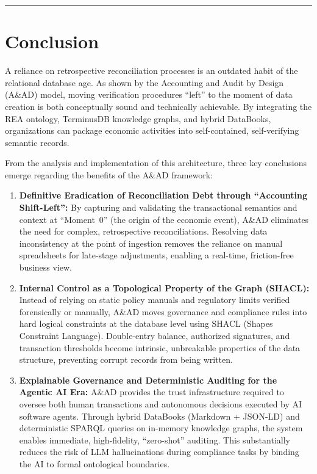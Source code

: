 \documentclass[12pt, a4paper]{article}
\begin{document}
\hrule
\vspace{1em}
\clearpage

\section{Conclusion}

A reliance on retrospective reconciliation processes is an outdated habit of the relational database age. As shown by the Accounting and Audit by Design (A\&AD) model, moving verification procedures ``left'' to the moment of data creation is both conceptually sound and technically achievable. By integrating the REA ontology, TerminusDB knowledge graphs, and hybrid DataBooks, organizations can package economic activities into self-contained, self-verifying semantic records.

From the analysis and implementation of this architecture, three key conclusions emerge regarding the benefits of the A\&AD framework:

\begin{enumerate}
\item \textbf{Definitive Eradication of Reconciliation Debt through ``Accounting Shift-Left'':} By capturing and validating the transactional semantics and context at ``Moment~0'' (the origin of the economic event), A\&AD eliminates the need for complex, retrospective reconciliations. Resolving data inconsistency at the point of ingestion removes the reliance on manual spreadsheets for late-stage adjustments, enabling a real-time, friction-free business view.

\item \textbf{Internal Control as a Topological Property of the Graph (SHACL):} Instead of relying on static policy manuals and regulatory limits verified forensically or manually, A\&AD moves governance and compliance rules into hard logical constraints at the database level using SHACL (Shapes Constraint Language). Double-entry balance, authorized signatures, and transaction thresholds become intrinsic, unbreakable properties of the data structure, preventing corrupt records from being written.

\item \textbf{Explainable Governance and Deterministic Auditing for the Agentic AI Era:} A\&AD provides the trust infrastructure required to oversee both human transactions and autonomous decisions executed by AI software agents. Through hybrid DataBooks (Markdown + JSON-LD) and deterministic SPARQL queries on in-memory knowledge graphs, the system enables immediate, high-fidelity, ``zero-shot'' auditing. This substantially reduces the risk of LLM hallucinations during compliance tasks by binding the AI to formal ontological boundaries.
\end{enumerate}
\end{document}

